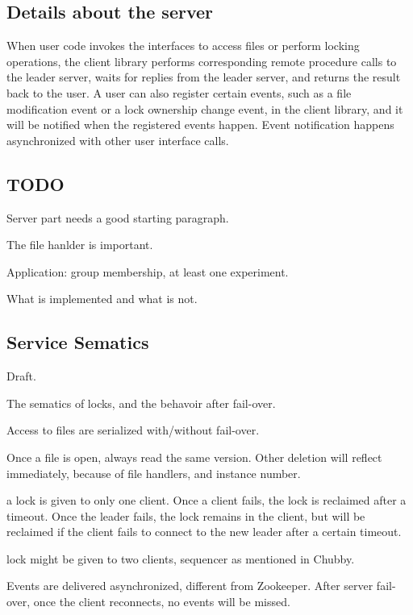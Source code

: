 \subsection{Details about the server}
When user code invokes the interfaces to access files or perform locking operations,
the client library performs corresponding remote procedure calls to the leader server,
waits for replies from the leader server, and returns the result back to the user.
A user can also register certain events,
such as a file modification event or a lock ownership change event, 
in the client library,
and it will be notified when the registered events happen.
Event notification happens asynchronized with other user interface calls.

\subsection{TODO}
Server part needs a good starting paragraph.

The file hanlder is important.

Application: group membership, at least one experiment.

What is implemented and what is not.

\subsection{Service Sematics}

Draft.

The sematics of locks, and the behavoir after fail-over.

Access to files are serialized with/without fail-over.

Once a file is open, always read the same version. Other deletion will
reflect immediately, because of file handlers, and instance number.

a lock is given to only one client. Once a client fails, the lock
is reclaimed after a timeout. Once the leader fails, the lock remains
in the client, but will be reclaimed if the client fails to connect
to the new leader after a certain timeout.

lock might be given to two clients, sequencer as mentioned in Chubby.

Events are delivered asynchronized, different from Zookeeper. After
server fail-over, once the client reconnects, no events will be missed.

